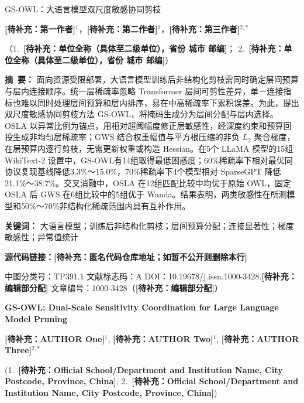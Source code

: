 \documentclass[UTF8,fontset=fandol]{ctexart}
\newcommand{\method}{GS-OWL}
\newcommand{\placeholder}[1]{\textbf{[待补充：#1]}}
\begin{document}

\begingroup
\setlength{\parindent}{0pt}
\begin{center}
{\heiti{} GS-OWL：大语言模型双尺度敏感协同剪枝\par}
\vspace{7pt}
{ \placeholder{第一作者}$^{1}$，\placeholder{第二作者}$^{1}$，\placeholder{第三作者}$^{2,*}$\par}
\vspace{4pt}
{
（1.\ \placeholder{单位全称（具体至二级单位），省份 城市 邮编}；
2.\ \placeholder{单位全称（具体至二级单位），省份 城市 邮编}）\par}
\end{center}

\vspace{5pt}
\noindent\textbf{摘\ 要：}
面向资源受限部署，大语言模型训练后非结构化剪枝需同时确定层间预算与层内连接顺序。统一层稀疏率忽略 Transformer 层间可剪性差异，单一连接指标也难以同时处理层间预算和层内排序，易在中高稀疏率下累积误差。为此，提出双尺度敏感协同剪枝方法 \method，将掩码生成分为层间分配与层内选择。OSLA 以异常比例为锚点，用相对超阈幅度修正层敏感性，经深度约束和预算回投生成非均匀层稀疏率；GWS 结合权重幅值与平方根压缩的非负 $L_2$ 聚合梯度，在层预算内逐行剪枝，无需更新权重或构造 Hessian。在5个 LLaMA 模型的15组 WikiText-2 设置中，\method 有14组取得最低困惑度；60\%稀疏率下相对最优同协议复现基线降低3.3\%～15.0\%，70\%稀疏率下4个模型相对 SparseGPT 降低21.1\%～38.7\%。交叉消融中，OSLA 在12组匹配比较中均优于原始 OWL，固定 OSLA 后 GWS 在6组比较中的5组优于 Wanda。结果表明，两类敏感性在所测模型和50\%～70\%非结构化稀疏范围内具有互补作用。

\noindent\textbf{关键词：}
大语言模型；训练后非结构化剪枝；层间预算分配；连接显著性；梯度敏感性；异常值统计

\noindent\textbf{源代码链接：}\placeholder{匿名代码仓库地址；如暂不公开则删除本行}

\noindent 中图分类号：TP391.1 \qquad 文献标志码：A \qquad
DOI：10.19678/j.issn.1000-3428.\placeholder{编辑部分配} \qquad
文章编号：1000-3428（\placeholder{编辑部分配}）

\vspace{8pt}
\begin{center}
{\bfseries{} GS-OWL: Dual-Scale Sensitivity Coordination for Large Language Model Pruning\par}
\vspace{5pt}
{ \placeholder{AUTHOR One}$^{1}$, \placeholder{AUTHOR Two}$^{1}$, \placeholder{AUTHOR Three}$^{2,*}$\par}
\vspace{3pt}
{
(1.\ \placeholder{Official School/Department and Institution Name, City Postcode, Province, China};
2.\ \placeholder{Official School/Department and Institution Name, City Postcode, Province, China})\par}
\end{center}
\end{document}
